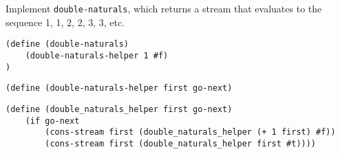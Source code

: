\begin{blocksection}
\question Implement \lstinline$double-naturals$, which returns a stream that evaluates to the sequence 1, 1, 2, 2, 3, 3, etc.

\begin{lstlisting}
(define (double-naturals)
    (double-naturals-helper 1 #f)
)
\end{lstlisting}

\ifprintanswers\else
\begin{lstlisting}
(define (double-naturals-helper first go-next)
\end{lstlisting}
\fi

\begin{solution}[2in]
\begin{lstlisting}
(define (double_naturals_helper first go-next)
    (if go-next
        (cons-stream first (double_naturals_helper (+ 1 first) #f))
        (cons-stream first (double_naturals_helper first #t))))
\end{lstlisting}
\end{solution}
\end{blocksection}
